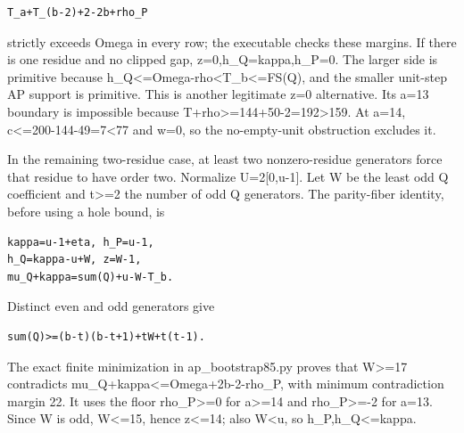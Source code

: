 \documentclass[10pt,a4paper]{article}
\theoremstyle{definition}
\begin{document}
\begin{lstlisting}
T_a+T_(b-2)+2-2b+rho_P
\end{lstlisting}

strictly exceeds Omega in every row; the executable checks these
margins. If there is one residue and no clipped gap,\allowbreak{}
z=\allowbreak{}0,\allowbreak{}h\_\allowbreak{}Q=\allowbreak{}kappa,\allowbreak{}h\_\allowbreak{}P=\allowbreak{}0. The larger side is primitive because
h\_\allowbreak{}Q\textless=\allowbreak{}Omega-rho\textless T\_\allowbreak{}b\textless=\allowbreak{}\textbar FS(Q),\allowbreak{}
and the smaller unit-step AP support is primitive. This is another
legitimate z=\allowbreak{}0 alternative. Its a=\allowbreak{}13 boundary is impossible because
T+\allowbreak{}rho\textgreater=\allowbreak{}144+\allowbreak{}50-2=\allowbreak{}192\textgreater159. At a=\allowbreak{}14,\allowbreak{}
c\textless=\allowbreak{}200-144-49=\allowbreak{}7\textless77 and w=\allowbreak{}0,\allowbreak{} so the no-empty-unit
obstruction excludes it.

In the remaining two-residue case,\allowbreak{} at least two nonzero-residue
generators force that residue to have order two. Normalize
U=\allowbreak{}2{[}0,\allowbreak{}u-1{]}. Let W be the least odd Q coefficient and t\textgreater=\allowbreak{}2
the number of odd Q generators. The parity-fiber identity,\allowbreak{} before using
a hole bound,\allowbreak{} is

\begin{lstlisting}
kappa=u-1+eta, h_P=u-1,
h_Q=kappa-u+W, z=W-1,
mu_Q+kappa=sum(Q)+u-W-T_b.
\end{lstlisting}

Distinct even and odd generators give

\begin{lstlisting}
sum(Q)>=(b-t)(b-t+1)+tW+t(t-1).
\end{lstlisting}

The exact finite minimization in ap\_\allowbreak{}bootstrap85.py proves that
W\textgreater=\allowbreak{}17 contradicts mu\_\allowbreak{}Q+\allowbreak{}kappa\textless=\allowbreak{}Omega+\allowbreak{}2b-2-rho\_\allowbreak{}P,\allowbreak{}
with minimum contradiction margin 22. It uses the floor
rho\_\allowbreak{}P\textgreater=\allowbreak{}0 for a\textgreater=\allowbreak{}14 and rho\_\allowbreak{}P\textgreater=\allowbreak{}-2 for
a=\allowbreak{}13. Since W is odd,\allowbreak{} W\textless=\allowbreak{}15,\allowbreak{} hence z\textless=\allowbreak{}14; also
W\textless u,\allowbreak{} so h\_\allowbreak{}P,\allowbreak{}h\_\allowbreak{}Q\textless=\allowbreak{}kappa.
\end{document}
